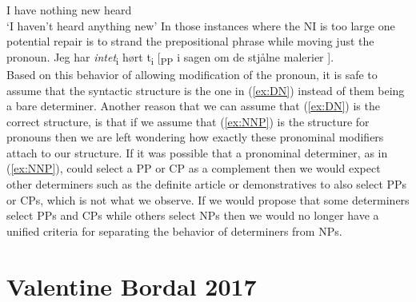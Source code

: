 \documentclass[12pt, letterpaper]{article}
\begin{document}
	I have nothing new heard\\
	\glt `I haven't heard anything new'
	\z
\ex In those instances where the NI is too large one potential repair is to strand the prepositional phrase while moving just the pronoun.
	\ea Jeg har \textit{intet}\textsubscript{i} hørt t\textsubscript{i} [\textsubscript{PP} i sagen om de stjålne malerier ].\\
	\z   
\ex Based on this behavior of allowing modification of the pronoun, it is safe to assume that the syntactic structure is the one in (\ref{ex:DN}) instead of them being a bare determiner.
\ex Another reason that we can assume that (\ref{ex:DN}) is the correct structure, is that if we assume that (\ref{ex:NNP}) is the structure for pronouns then we are left wondering how exactly these pronominal modifiers attach to our structure.
\ex If it was possible that a pronominal determiner, as in (\ref{ex:NNP}), could select a PP or CP as a complement then we would expect other determiners such as the definite article or demonstratives to also select PPs or CPs, which is not what we observe. If we would propose that some determiners select PPs and CPs while others select NPs then we would no longer have a unified criteria for separating the behavior of determiners from NPs. 
\z

\section{Valentine Bordal 2017} \label{sec:VB}
\end{document}
